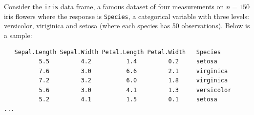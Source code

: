 \documentclass[12pt,landscape]{article}
\newcommand{\instr}{\small Your answer will consist of a lowercase string (e.g. \texttt{aebgd}) where the order of the letters does not matter. \normalsize}
\begin{document}
%
%
%
%
%


\problem{} Consider the \texttt{iris} data frame, a famous dataset of four measurements on $n = 150$ iris flowers where the response is \texttt{Species}, a categorical variable with three levels: versicolor, viriginica and setosa (where each species has 50 observations). Below is a sample:

\lstset{
  basicstyle=\footnotesize,
  xleftmargin=.2\textwidth, xrightmargin=.2\textwidth
}
\begin{lstlisting}
   Sepal.Length Sepal.Width Petal.Length Petal.Width   Species
          5.5         4.2          1.4         0.2     setosa
          7.6         3.0          6.6         2.1     virginica
          7.2         3.2          6.0         1.8     virginica
          5.6         3.0          4.1         1.3     versicolor
          5.2         4.1          1.5         0.1     setosa
...
\end{lstlisting}
\end{document}
